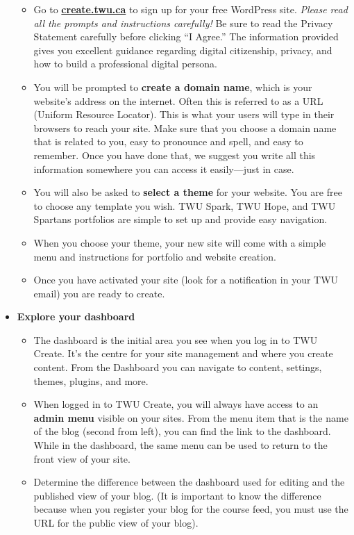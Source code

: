 \documentclass[
  letterpaper,
  DIV=11,
  numbers=noendperiod]{scrreprt}
\providecommand{\tightlist}{%
  \setlength{\itemsep}{0pt}\setlength{\parskip}{0pt}}\usepackage{longtable,booktabs,array}
\begin{document}
\begin{tcolorbox}
\begin{itemize}
  \begin{itemize}
  \tightlist
  \item
    Go to \href{https://create.twu.ca/}{\textbf{create.twu.ca}} to sign
    up for your free WordPress site. \emph{Please read all the prompts
    and instructions carefully!} Be sure to read the Privacy Statement
    carefully before clicking ``I Agree.'' The information provided
    gives you excellent guidance regarding digital citizenship, privacy,
    and how to build a professional digital persona.
  \item
    You will be prompted to \textbf{create a domain name}, which is your
    website's address on the internet. Often this is referred to as a
    URL (Uniform Resource Locator). This is what your users will type in
    their browsers to reach your site. Make sure that you choose a
    domain name that is related to you, easy to pronounce and spell, and
    easy to remember. Once you have done that, we suggest you write all
    this information somewhere you can access it easily---just in case.
  \item
    You will also be asked to \textbf{select a theme} for your website.
    You are free to choose any template you wish. TWU Spark, TWU Hope,
    and TWU Spartans portfolios are simple to set up and provide easy
    navigation.
  \item
    When you choose your theme, your new site will come with a simple
    menu and instructions for portfolio and website creation.
  \item
    Once you have activated your site (look for a notification in your
    TWU email) you are ready to create.
  \end{itemize}
\item
  \textbf{Explore your dashboard}

  \begin{itemize}
  \tightlist
  \item
    The dashboard is the initial area you see when you log in to TWU
    Create. It's the centre for your site management and where you
    create content. From the Dashboard you can navigate to content,
    settings, themes, plugins, and more.
  \item
    When logged in to TWU Create, you will always have access to an
    \textbf{admin menu} visible on your sites. From the menu item that
    is the name of the blog (second from left), you can find the link to
    the dashboard. While in the dashboard, the same menu can be used to
    return to the front view of your site.
  \item
    Determine the difference between the dashboard used for editing and
    the published view of your blog. (It is important to know the
    difference because when you register your blog for the course feed,
    you must use the URL for the public view of your blog).
  \end{itemize}
\end{itemize}


\end{tcolorbox}
\end{document}
